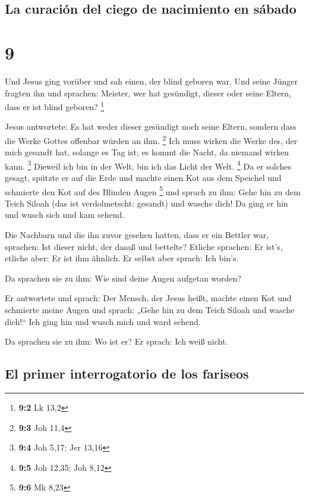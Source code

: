 \hypertarget{la-curaciuxf3n-del-ciego-de-nacimiento-en-suxe1bado}{%
\subsection{La curación del ciego de nacimiento en
sábado}\label{la-curaciuxf3n-del-ciego-de-nacimiento-en-suxe1bado}}

\hypertarget{section-8}{%
\section{9}\label{section-8}}

 Und Jesus ging vorüber und sah einen, der blind geboren
war.  Und seine Jünger fragten ihn und sprachen: Meister,
wer hat gesündigt, dieser oder seine Eltern, dass er ist blind geboren?
\footnote{\textbf{9:2} Lk 13,2}

 Jesus antwortete: Es hat weder dieser gesündigt noch
seine Eltern, sondern dass die Werke Gottes offenbar würden an ihm.
\footnote{\textbf{9:3} Joh 11,4}  Ich muss wirken die
Werke des, der mich gesandt hat, solange es Tag ist; es kommt die Nacht,
da niemand wirken kann. \footnote{\textbf{9:4} Joh 5,17; Jer 13,16}
 Dieweil ich bin in der Welt, bin ich das Licht der Welt.
\footnote{\textbf{9:5} Joh 12,35; Joh 8,12}  Da er solches
gesagt, spützte er auf die Erde und machte einen Kot aus dem Speichel
und schmierte den Kot auf des Blinden Augen \footnote{\textbf{9:6} Mk
  8,23}  und sprach zu ihm: Gehe hin zu dem Teich Siloah
(das ist verdolmetscht: gesandt) und wasche dich! Da ging er hin und
wusch sich und kam sehend.

 Die Nachbarn und die ihn zuvor gesehen hatten, dass er
ein Bettler war, sprachen: Ist dieser nicht, der dasaß und bettelte?
 Etliche sprachen: Er ist's, etliche aber: Er ist ihm
ähnlich. Er selbst aber sprach: Ich bin's.

 Da sprachen sie zu ihm: Wie sind deine Augen aufgetan
worden?

 Er antwortete und sprach: Der Mensch, der Jesus heißt,
machte einen Kot und schmierte meine Augen und sprach: „Gehe hin zu dem
Teich Siloah und wasche dich!{}`` Ich ging hin und wusch mich und ward
sehend.

 Da sprachen sie zu ihm: Wo ist er? Er sprach: Ich weiß
nicht.

\hypertarget{el-primer-interrogatorio-de-los-fariseos}{%
\subsection{El primer interrogatorio de los
fariseos}\label{el-primer-interrogatorio-de-los-fariseos}}

